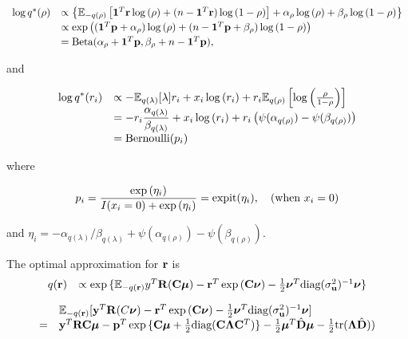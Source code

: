 \documentclass{article}[12pt]
\begin{document}
$$
\begin{array}{rl}
\log{q^*(\rho)} 
    &
    \propto \left\{ 
    {\mathbb E}_{-q(\rho)}\left[ 
    {\bf 1}^T{\bf r} \log{(\rho)} 
    + (n - {\bf 1}^T{\bf r}) \log{(1 - \rho)} 
    \right] 
    + \alpha_\rho \log{(\rho)} 
    + \beta_\rho \log{(1 - \rho)} 
    \right\} 
    \\ [0.5ex]
    &
    \propto \exp \left( 
    ({\bf 1}^T{\bf p} + \alpha_\rho) \log{(\rho)} 
    + (n - {\bf 1}^T{\bf p} + \beta_\rho) \log{(1 - \rho)} 
    \right) 
    \\ [0.5ex]
    &= \text{Beta} (\alpha_\rho + {\bf 1}^T{\bf p}, \beta_\rho + n - {\bf 1}^T{\bf p}),
\end{array}
$$

\noindent and

$$
\begin{array}{rl}
\ds \log{q^*(r_i)} &\propto -\bE_{q(\lambda)} [\lambda ] r_i + x_i \log{(r_i)} + r_i \bE_{q(\rho)} \left[\log{\left(\frac{\rho}{1 - \rho}\right)}\right]\\[0.5ex]
& \ds = -r_i \frac{\alpha_{q(\lambda)}}{\beta_{q(\lambda)}} + x_i \log{(r_i)} + r_i \left(\psi(\alpha_{q(\rho)}) - \psi(\beta_{q(\rho)})\right)\\ [0.5ex]%
& \ds = \text{Bernoulli}(p_i)
\end{array}
$$

\noindent where

$$
\begin{array}{rl}
\displaystyle p_i 
     = \frac{\exp{(\eta_i)}}{I(x_i = 0) + \exp{(\eta_i)}}  
     = \text{expit}(\eta_i), \quad \mbox{(when $x_i = 0$)} 
\end{array}
$$

\noindent and $\eta_i = - \alpha_{q(\lambda)}/\beta_{q(\lambda)} + \psi(\alpha_{q(\rho)}) - \psi(\beta_{q(\rho)})$.

\noindent The optimal approximation for ${\bf r}$ is
$$
\begin{array}{rl}
q({\bf r}) &\propto \exp{\{{\mathbb E}_{-q({\bf r})}y^T{\bf R}({\bf C}{\boldsymbol\mu}) - {\bf r}^T\exp{({\bf C}{\boldsymbol\nu})}-{\frac{1}{2}}{\boldsymbol\nu}^T \text{diag}(\sigma_{{\bf u}}^2)^{-1} {\boldsymbol\nu}\}}
\end{array}
$$

$$
\begin{array}{rl}
&{\mathbb E}_{-q({\bf r})} [{\bf y}^T{\bf R}(C{\boldsymbol \nu}) - {\bf r}^T\exp{({\bf C}{\boldsymbol\nu})}-{\frac{1}{2}} {\boldsymbol \nu}^T \text{diag}(\sigma_{{\bf u}}^2)^{-1} {\boldsymbol \nu}]\\
=&{\bf y}^T{\bf R}{\bf C} {\boldsymbol \mu} - {\bf p}^T \exp{\{{\bf C}{\boldsymbol\mu}+ {\frac{1}{2}}\text{diag}({\bf C}{\boldsymbol\Lambda}{\bf C}^T)\}} - {\frac{1}{2}} {\boldsymbol \mu}^T \hat{{\bf D}} {\boldsymbol \mu} - {\frac{1}{2}} \text{tr}({\boldsymbol \Lambda} \hat{{\bf D}} ))
\end{array}
$$
\end{document}
